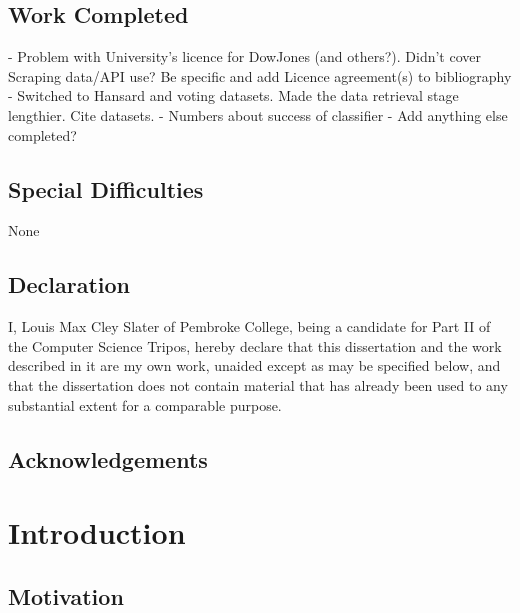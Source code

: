 \documentclass[12pt,a4paper,twoside,openright]{report}
\begin{document}
\section*{Work Completed}
 - Problem with University's licence for DowJones (and others?). Didn't cover Scraping data/API use? Be specific and add Licence agreement(s) to bibliography
 - Switched to Hansard and voting datasets. Made the data retrieval stage lengthier. Cite datasets.
 - Numbers about success of classifier
 - Add anything else completed?


\section*{Special Difficulties}
None
 
\newpage
\section*{Declaration}

I, Louis Max Cley Slater of Pembroke College, being a candidate for Part II of the Computer Science Tripos, hereby declare that this dissertation and the work described in it are my own work, unaided except as may be specified below, and that the dissertation does not contain material that has already been used to any substantial extent for a comparable purpose.

\bigskip
{}

\medskip
{}

\setcounter{tocdepth}{4}
\setcounter{secnumdepth}{4}
\tableofcontents

\listoffigures

\newpage
\section*{Acknowledgements}





\pagestyle{headings}

\chapter{Introduction}

\section{Motivation}
\end{document}
